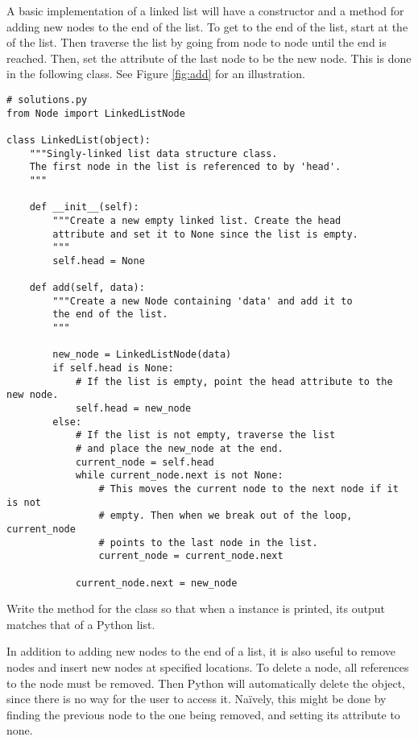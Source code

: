 A basic implementation of a linked list will have a constructor and a method for adding new nodes to the end of the list.
To get to the end of the list, start at the  of the list.
Then traverse the list by going from node to node until the end is reached.
Then, set the  attribute of the last node to be the new node.
This is done in the following class.
See Figure \ref{fig:add} for an illustration.

\begin{lstlisting}
# solutions.py
from Node import LinkedListNode

class LinkedList(object):
	"""Singly-linked list data structure class.
	The first node in the list is referenced to by 'head'.
	"""
	
	def __init__(self):
		"""Create a new empty linked list. Create the head
		attribute and set it to None since the list is empty.
		"""
		self.head = None

	def add(self, data):
		"""Create a new Node containing 'data' and add it to
		the end of the list.
		"""

		new_node = LinkedListNode(data)
		if self.head is None:
			# If the list is empty, point the head attribute to the new node.
			self.head = new_node
		else:
			# If the list is not empty, traverse the list
			# and place the new_node at the end.
			current_node = self.head
			while current_node.next is not None:
				# This moves the current node to the next node if it is not
				# empty. Then when we break out of the loop, current_node
				# points to the last node in the list.
				current_node = current_node.next

			current_node.next = new_node
\end{lstlisting}

\begin{problem}
Write the  method for the  class so that when a  instance is printed, its output matches that of a Python list.
\end{problem}

In addition to adding new nodes to the end of a list, it is also useful to remove nodes and insert new nodes at specified locations.
To delete a node, all references to the node must be removed.
Then Python will automatically delete the object, since there is no way for the user to access it.
Na{\"i}vely, this might be done by finding the previous node to the one being removed, and setting its  attribute to none.

